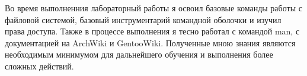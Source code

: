     Во время выполненния лабораторный работы я освоил базовые команды работы с файловой системой, базовый инструментарий командной оболочки и изучил права доступа. Также в процессе выполнения я тесно работал с командой man, с документацией на ArchWiki\cite{archwiki} и GentooWiki\cite{gentoowiki}. Полученные мною знания являются необходимым минимумом для дальнейшего обучения и выполнения более сложных действий.
    \newpage





